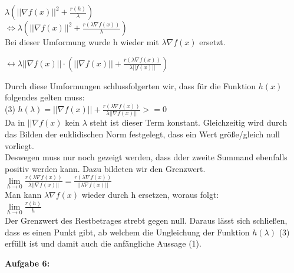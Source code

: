 \documentclass{article}
\begin{document}
\begin{multicols}{2}
$\lambda (||\nabla f(x)||^2 + \frac{r(h)}{\lambda})$ \\

$\Leftrightarrow \lambda(||\nabla f(x)||^2 + \frac{r(\lambda \nabla f(x))}{\lambda})$ \\

Bei dieser Umformung wurde h wieder mit $\lambda\nabla f(x)$ ersetzt.

$\leftrightarrow \lambda ||\nabla f(x)|| \cdot (||\nabla f(x)|| + \frac{r(\lambda \nabla f(x))}{\lambda || f(x)||})$


Durch diese Umformungen schlussfolgerten wir, dass f\"ur die Funktion $h(x)$ folgendes gelten muss:\\
(3) $h(\lambda)=||\nabla f(x)|| + \frac{r(\lambda\nabla f(x))}{\lambda||\nabla f(x)||} >=0$ \\

Da in $||\nabla f(x)$ kein $\lambda$ steht ist dieser Term konstant. Gleichzeitig wird durch das Bilden der euklidischen Norm festgelegt, dass ein Wert größe/gleich null vorliegt. \\ %
Deswegen muss nur noch gezeigt werden, dass dder zweite Summand ebenfalls positiv werden kann. Dazu bildeten wir den Grenzwert. \\ %
$\lim\limits_{h \rightarrow 0}{\frac{r(\lambda \nabla f(x))}{\lambda ||\nabla f(x)||}} = \frac{r(\lambda \nabla f(x))}{||\lambda  \nabla f(x)||}$ \\ %

Man kann $\lambda \nabla f(x)$ wieder durch h ersetzen, woraus folgt: \\
$\lim\limits_{h \rightarrow 0} \frac{r(h)}{h}$ \\

Der Grenzwert des Restbetrages strebt gegen null. Daraus lässt sich schließen, dass es einen Punkt gibt, ab welchem die Ungleichung der Funktion $h(\lambda)$ (3) erfüllt ist und damit auch die anfängliche Aussage (1). \\ %
\vspace{15pt}

\textbf{Aufgabe 6:} \\


\end{multicols}
\end{document}
